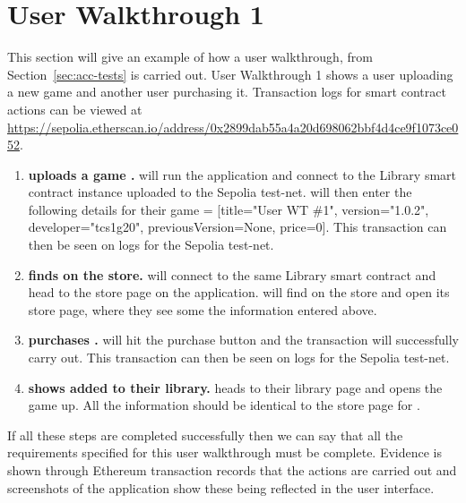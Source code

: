 
\chapter{User Walkthrough 1}\label{app:user-walkthrough}

This section will give an example of how a user walkthrough, from Section~\ref{sec:acc-tests} is carried out. User Walkthrough 1 shows a user  uploading a new game  and another user  purchasing it. Transaction logs for smart contract actions can be viewed at \url{https://sepolia.etherscan.io/address/0x2899dab55a4a20d698062bbf4d4ce9f1073ce052}.

\begin{enumerate}
  \item \textbf{ uploads a game .}
  \newline {} will run the application and connect to the Library smart contract instance uploaded to the Sepolia test-net.  will then enter the following details for their game  = [title="User WT \#1", version="1.0.2", developer="tcs1g20", previousVersion=None, price=0].
  \newline This transaction can then be seen on logs for the Sepolia test-net.

  \item \textbf{ finds  on the store.}
  \newline {} will connect to the same Library smart contract and head to the store page on the application.  will find  on the store and open its store page, where they see some the information entered above.
  
  \item \textbf{ purchases .}
  \newline {} will hit the purchase button and the transaction will successfully carry out. This transaction can then be seen on logs for the Sepolia test-net.
  
  \item \textbf{ shows  added to their library.}
  \newline {} heads to their library page and opens the game up. All the information should be identical to the store page for .
\end{enumerate}

\newparagraph
If all these steps are completed successfully then we can say that all the requirements specified for this user walkthrough must be complete. Evidence is shown through Ethereum transaction records that the actions are carried out and screenshots of the application show these being reflected in the user interface.